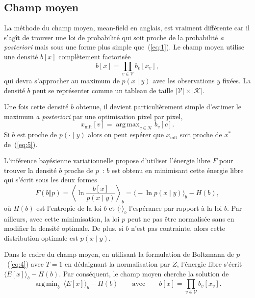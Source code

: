 \documentclass[a4paper,11pt,oneside]{article}
\DeclareMathOperator*{\argmax}{arg\,max}
\DeclareMathOperator*{\argmin}{arg\,min}
\begin{document}
\subsection{Champ moyen}
\label{sec:champ-moyen}

La méthode du champ moyen, \textenglish{mean-field} en
anglais, est vraiment différente car il s'agît de trouver
une loi de probabilité qui soit proche de la probabilité
\emph{a posteriori} mais sous une forme plus simple
que~(\ref{eq:1}). Le champ moyen utilise une densité $b[x]$
complètement factorisée
\begin{equation}
  \label{eq:7}
  b[x] = \prod_{v\in\mathcal V} b_v[x_v],
\end{equation}
qui devra s'approcher au maximum de $p(x\mid y)$ avec les
observations $y$ fixées. La densité $b$ peut se représenter
comme un tableau de taille $|\mathcal V|\times|\mathcal K|$.

Une fois cette densité $b$ obtenue, il devient
particulièrement simple d'estimer le maximum \emph{a
  posteriori} par une optimisation pixel par pixel,
\begin{equation}
  \label{eq:8}
  x_\text{mft}[v] = \argmax_{c\in\mathcal K} b_v[c].
\end{equation}
Si $b$ est proche de $p(\cdot\mid y)$ alors on peut espérer
que $x_\text{mft}$ soit proche de $x^*$ de~(\ref{eq:5}).

L'inférence bayésienne variationnelle propose d'utiliser
l'énergie libre $F$ pour trouver la densité $b$ proche de
$p$~\cite{GB20}: $b$ est obtenu en minimisant cette énergie
libre qui s'écrit sous les deux formes
\begin{equation}
  \label{eq:9}
  F(b{\mathop\Vert}p)
  = \left\langle\ln\frac{b[x]}{p(x\mid y)}\right\rangle_b
  = \bigl\langle-\ln p(x\mid y)\bigr\rangle_b - H(b),
\end{equation}
où $H(b)$ est l'entropie de la loi $b$ et
$\langle\cdot\rangle_b$ l'espérance par rapport à la loi
$b$. Par ailleurs, avec cette minimisation, la loi $p$ peut
ne pas être normalisée sans en modifier la densité optimale.
De plus, si $b$ n'est pas contrainte, alors cette
distribution optimale est $p(x\mid y).$

Dans le cadre du champ moyen, en utilisant la formulation de
Boltzmann de $p$~(\ref{eq:4}) avec $T=1$ en dédaignant la
normalisation par $Z$, l'énergie libre s'écrit $\bigl\langle
E[x]\bigr\rangle_b - H(b)$. Par conséquent, le champ moyen
cherche la solution de
\begin{equation}
  \label{eq:10}
  \argmin_b\ \bigl\langle E[x]\bigr\rangle_b - H(b)
  \qquad\text{avec}\qquad
  b[x] = \prod_{v\in\mathcal V} b_v[x_v].
\end{equation}
\end{document}

